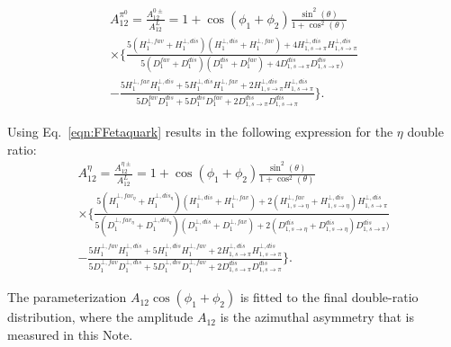 \begin{multline}
A_{12}^{\pi^0}=\frac{A^{0\pm}_{12}}{A^L_{12}}=1+\cos(\phi_1+\phi_2)\frac{\sin^2(\theta)}{1+\cos^2(\theta)} \\
\times\bigg\{\frac{5(H^{\bot,fav}_1+H^{\bot,dis}_1)(H^{\bot,dis}_1+H^{\bot,fav}_1)+4H^{\bot,dis}_{1,s\rightarrow\pi}H^{\bot,dis}_{1,s\rightarrow\pi}}{5(D^{fav}_1+D^{dis}_1)(D^{dis}_1+D^{fav}_1)+4D^{dis}_{1,s\rightarrow\pi}D^{dis}_{1,s\rightarrow\pi})}\\
-\frac{5H^{\bot,fav}_1H^{\bot,dis}_1+5H^{\bot,dis}_1H^{\bot,fav}_1+2H^{\bot,dis}_{1,s\rightarrow\pi}H^{\bot,dis}_{1,s\rightarrow\pi}}{5D^{fav}_1D^{dis}_1+5D^{dis}_1D^{fav}_1+2D^{dis}_{1,s\rightarrow\pi}D^{dis}_{1,s\rightarrow\pi}} \bigg\}.
\label{eqn:FF5}
\end{multline}


Using Eq.~\eqref{eqn:FFetaquark} results in the following expression for the \(\eta\) double ratio:
\begin{multline}
A_{12}^{\eta}=\frac{A^{\eta\pm}_{12}}{A^L_{12}}=1+\cos(\phi_1+\phi_2)\frac{\sin^2(\theta)}{1+\cos^2(\theta)} \\
\times\bigg\{\frac{5(H^{\bot,fav_\eta}_1+H^{\bot,dis_\eta}_1)(H^{\bot,dis}_1+H^{\bot,fav}_1)+2(H^{\bot,fav}_{1,s\rightarrow\eta}+H^{\bot,dis}_{1,s\rightarrow\eta})H^{\bot,dis}_{1,s\rightarrow\pi}}{5(D^{\bot,fav_\eta}_1+D^{\bot,dis_\eta}_1)(D^{\bot,dis}_1+D^{\bot,fav}_1)+2(D^{dis}_{1,s\rightarrow\eta}+D^{dis}_{1,s\rightarrow\eta})D^{dis}_{1,s\rightarrow\pi})}\\
-\frac{5H^{\bot,fav}_1H^{\bot,dis}_1+5H^{\bot,dis}_1H^{\bot,fav}_1+2H^{\bot,dis}_{1,s\rightarrow\pi}H^{\bot,dis}_{1,s\rightarrow\pi}}{5D^{\bot,fav}_1D^{\bot,dis}_1+5D^{\bot,dis}_1D^{\bot,fav}_1+2D^{dis}_{1,s\rightarrow\pi}D^{dis}_{1,s\rightarrow\pi}} \bigg\}.
\label{eqn:FF5eta}
\end{multline}

The parameterization $A_{12} \cos(\phi_1+\phi_2)$ is fitted to the final double-ratio distribution, where the amplitude $A_{12}$ is the azimuthal asymmetry that is measured in this Note. 